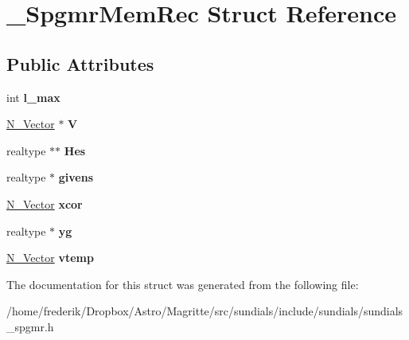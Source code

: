 \hypertarget{struct__SpgmrMemRec}{}\section{\+\_\+\+Spgmr\+Mem\+Rec Struct Reference}
\label{struct__SpgmrMemRec}
\subsection*{Public Attributes}
\begin{DoxyCompactItemize}
\item 
\mbox{\label{struct__SpgmrMemRec_a943cccc7d6bb580097bb63747862b6b3}} 
int {\bfseries l\+\_\+max}
\item 
\mbox{\label{struct__SpgmrMemRec_ad20cdb76436aefb546886d26c930bbec}} 
\mbox{\hyperlink{struct__generic__N__Vector}{N\+\_\+\+Vector}} $\ast$ {\bfseries V}
\item 
\mbox{\label{struct__SpgmrMemRec_add02e9d9040736b64b8e883162fbdfe9}} 
realtype $\ast$$\ast$ {\bfseries Hes}
\item 
\mbox{\label{struct__SpgmrMemRec_a5b393e763037acec50d9520bf5bbd858}} 
realtype $\ast$ {\bfseries givens}
\item 
\mbox{\label{struct__SpgmrMemRec_a1f11c1e1fb51403a5bc8e0d1ee8c523e}} 
\mbox{\hyperlink{struct__generic__N__Vector}{N\+\_\+\+Vector}} {\bfseries xcor}
\item 
\mbox{\label{struct__SpgmrMemRec_ab6db47b120908d49f7ec5e8093cfa6f7}} 
realtype $\ast$ {\bfseries yg}
\item 
\mbox{\label{struct__SpgmrMemRec_acf199ef0c2d0953c33e052328ea6bc44}} 
\mbox{\hyperlink{struct__generic__N__Vector}{N\+\_\+\+Vector}} {\bfseries vtemp}
\end{DoxyCompactItemize}


The documentation for this struct was generated from the following file\+:\begin{DoxyCompactItemize}
\item 
/home/frederik/\+Dropbox/\+Astro/\+Magritte/src/sundials/include/sundials/sundials\+\_\+spgmr.\+h\end{DoxyCompactItemize}
